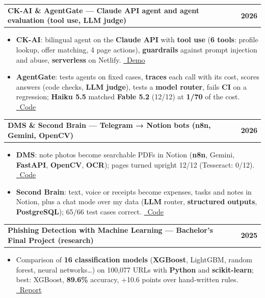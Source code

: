 \documentclass[a4paper,10pt]{article}
\makeatletter
\newenvironment{joblong}[2]
{\begin{tabularx}{\linewidth}{@{}X r@{}}\textbf{#1} & \textbf{#2}\\[2pt]\end{tabularx}\begin{itemize}}
{\end{itemize}}
\makeatother
\begin{document}
\begin{joblong}{CK-AI \& AgentGate — Claude API agent and agent evaluation (tool use, LLM judge)}{2026}
\item \textbf{CK-AI}: bilingual agent on the \textbf{Claude API} with \textbf{tool use} (\textbf{6 tools}: profile lookup, offer matching, 4 page actions), \textbf{guardrails} against prompt injection and abuse, \textbf{serverless} on Netlify. \href{https://chemseddine-kebaily.netlify.app/en/}{\faGlobe\ Demo}
\item \textbf{AgentGate}: tests agents on fixed cases, \textbf{traces} each call with its cost, scores answers (code checks, \textbf{LLM judge}), tests a \textbf{model router}, fails \textbf{CI} on a regression; \textbf{Haiku 5.5} matched \textbf{Fable 5.2} (12/12) at \textbf{1/70} of the cost. \href{https://github.com/adkebaily/agentgate}{\faGithub\ Code}
\end{joblong}

\begin{joblong}{DMS \& Second Brain — Telegram → Notion bots (n8n, Gemini, OpenCV)}{2026}
\item \textbf{DMS}: note photos become searchable PDFs in Notion (\textbf{n8n}, Gemini, \textbf{FastAPI}, \textbf{OpenCV}, \textbf{OCR}); pages turned upright 12/12 (Tesseract: 0/12). \href{https://github.com/adkebaily/telegram-notion-dms}{\faGithub\ Code}
\item \textbf{Second Brain}: text, voice or receipts become expenses, tasks and notes in Notion, plus a chat mode over my data (\textbf{LLM} router, \textbf{structured outputs}, \textbf{PostgreSQL}); 65/66 test cases correct. \href{https://github.com/adkebaily/second-brain-bot}{\faGithub\ Code}
\end{joblong}

\begin{joblong}{Phishing Detection with Machine Learning — Bachelor's Final Project (research)}{2025}
\item Comparison of \textbf{16 classification models} (\textbf{XGBoost}, LightGBM, random forest, neural networks…) on 100,077 URLs with \textbf{Python} and \textbf{scikit-learn}; best: XGBoost, \textbf{89.6\%} accuracy, +10.6 points over hand-written rules. \href{https://drive.google.com/file/d/1_rFw27PhBd6QnFyeZe5N6PHuoE_wE1JD/view}{\faFilePdf\ Report}
\end{joblong}

\end{document}
